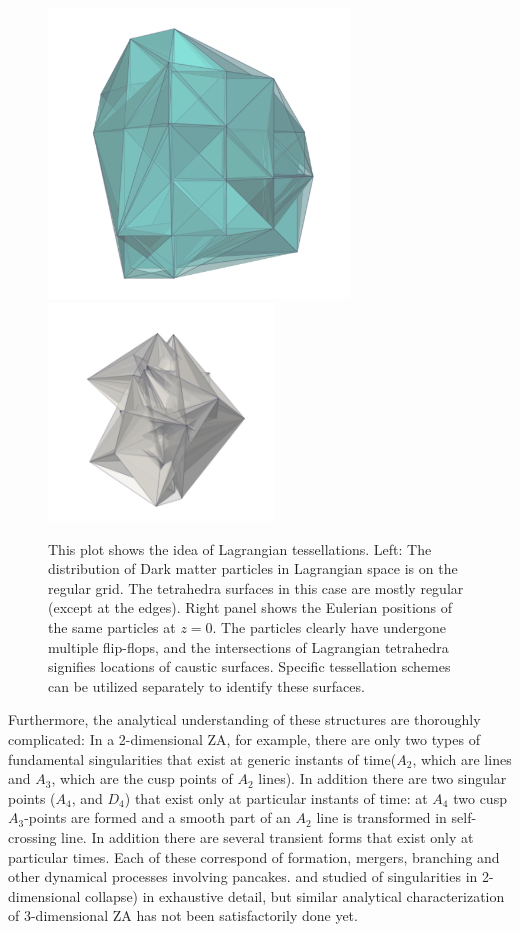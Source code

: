 \begin{figure} 
\centering\includegraphics[width=8cm]{Chapter2/Plots/qDel.png}
\centering\includegraphics[width=6cm]{Chapter2/Plots/x.png}
\caption{ This plot shows the idea of Lagrangian tessellations. Left: The distribution of Dark matter particles in Lagrangian space is on the regular grid. The tetrahedra surfaces in this case are mostly regular (except at the edges). Right panel shows the Eulerian positions of the same particles at $z=0$. The particles clearly have undergone multiple flip-flops, and the intersections of Lagrangian tetrahedra signifies locations of caustic surfaces. Specific tessellation schemes can be utilized separately to identify these surfaces. }
\label{fig:Tess}
\end{figure}


Furthermore, the analytical understanding of these structures are thoroughly complicated: In a 2-dimensional ZA, for example, there are only two types of fundamental singularities that exist at generic instants of time($A_2$, which are lines and $A_3$, which are the cusp points of $A_2$ lines).   In addition there are two singular points ($A_4$, and $D_4$) that exist  only at particular instants of time: at $A_4$ two cusp $A_3$-points are formed and a smooth part of an $A_2$ line is  transformed in self-crossing
line. In addition there are several transient forms that exist only 
at particular times.
Each of these correspond of formation, mergers, branching and other dynamical processes involving pancakes. \cite{Arnold1982} and \cite{Hidding2014} studied of singularities in 2-dimensional collapse) in exhaustive detail, but similar analytical characterization of 3-dimensional ZA has not been satisfactorily done yet.  
 
